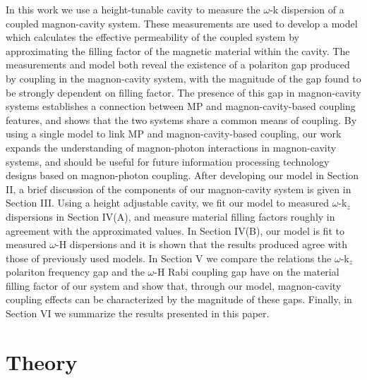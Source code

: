 \documentclass[prb,twocolumn,showpacs,preprintnumbers,amsmath,amssymb]{revtex4-1}
\begin{document}
In this work we use a height-tunable cavity to measure the $\omega$-k dispersion of a coupled magnon-cavity system. These measurements are used to develop a model which calculates the effective permeability of the coupled system by approximating the filling factor of the magnetic material within the cavity. The measurements and model both reveal the existence of a polariton gap produced by coupling in the magnon-cavity system, with the magnitude of the gap found to be strongly dependent on filling factor. The presence of this gap in magnon-cavity systems establishes a connection between MP and magnon-cavity-based coupling features, and shows that the two systems share a common means of coupling. By using a single model to link MP and magnon-cavity-based coupling, our work expands the understanding of magnon-photon interactions in magnon-cavity systems, and should be useful for future information processing technology designs based on magnon-photon coupling. After developing our model in Section II, a brief discussion of the components of our magnon-cavity system is given in Section III. Using a height adjustable cavity, we fit our model to measured $\omega$-k$_{z}$ dispersions in Section IV(A), and measure material filling factors roughly in agreement with the approximated values. In Section IV(B), our model is fit to measured $\omega$-H dispersions and it is shown that the results produced agree with those of previously used models\cite{A,F,G,N,C,KK}. In Section V we compare the relations the $\omega$-k$_{z}$ polariton frequency gap and the $\omega$-H Rabi coupling gap have on the material filling factor of our system and show that, through our model, magnon-cavity coupling effects can be characterized by the magnitude of these gaps. Finally, in Section VI we summarize the results presented in this paper.










\section{Theory}
\end{document}
